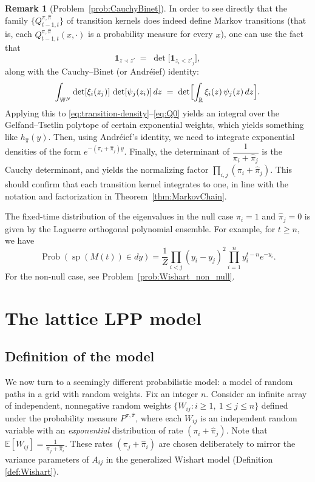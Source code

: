 \documentclass[letterpaper,11pt,oneside,reqno]{article}
\numberwithin{equation}{section}
\theoremstyle{definition}
\newtheorem{remark}[proposition]{Remark}
\begin{document}
\begin{remark}[Problem~\ref{prob:CauchyBinet}]
\label{rem:CauchyBinet}
In order to see directly that the family $\bigl\{Q^{\pi,\hat{\pi}}_{t-1,t}\bigr\}$ of transition kernels does indeed define Markov transitions (that is, each $Q^{\pi,\hat{\pi}}_{t-1,t}(x,\cdot)$ is a probability measure for every $x$), one can use the fact that
\[
	\mathbf{1}_{z \prec z'}
\;=\;
\det\bigl[\mathbf{1}_{z_i < z'_j}\bigr],
\]
along with the Cauchy--Binet (or Andr\'eief) identity:
\[
\int_{\mathbb{W}^N}
\det[\xi_i(z_j)]\,
\det[\psi_j(z_i)]
\,dz
\;=\;
\det\Bigl[
\int_{\mathbb{R}}
\xi_i(z)\,\psi_j(z)\,dz
\Bigr].
\]
Applying this to
\eqref{eq:transition-density}--\eqref{eq:Q0}
yields an integral over the Gelfand--Tsetlin polytope
of certain exponential weights, which yields something like $h_{\hat \pi}(y)$.
Then, using Andr\'eief's identity, we need to integrate
exponential densities of the form $e^{-(\pi_i+\hat \pi_j)y}$.
Finally, the determinant of $\dfrac{1}{\pi_i+\hat \pi_j}$ is the Cauchy determinant,
and yields the normalizing factor
$\prod_{i,j}(\pi_i+\hat \pi_j)$.
This should
confirm that each transition kernel
integrates to one, in line with the notation and
factorization in Theorem~\ref{thm:MarkovChain}.
\end{remark}

The fixed-time distribution of the eigenvalues
in the null case $\pi_i=1$ and $\hat\pi_j=0$ is
given by the Laguerre orthogonal polynomial ensemble. For example, for $t\ge n$, we have
\begin{equation}
	\label{eq:Laguerre}
	\operatorname{Prob}(\operatorname{sp}(M(t))\in dy)
	=
	\frac{1}{Z}\prod_{i<j}(y_i-y_j)^2
	\prod_{i=1}^n y_i^{t-n} e^{-y_i}.
\end{equation}
For the non-null case, see Problem~\ref{prob:Wishart_non_null}.

\section{The lattice LPP model}

\subsection{Definition of the model}

We now turn to a seemingly different probabilistic model: a
model of random paths in a grid with random weights. Fix an
integer $n$. Consider an infinite array of independent,
nonnegative random weights $\{W_{ij}: i\ge 1,\ 1\le j\le n\}$ defined under the probability measure $P^{\pi,\hat\pi}$,
where each $W_{ij}$ is an independent random variable with
an \emph{exponential} distribution of rate $(\pi_i +
\hat\pi_j)$.
Note that $\mathbb{E}[W_{ij}] = \frac{1}{\pi_j+\hat\pi_i}$.
These rates $(\pi_j+\hat\pi_i)$ are chosen deliberately to
mirror the variance parameters of $A_{ij}$ in the
generalized Wishart model (Definition \ref{def:Wishart}).
\end{document}
